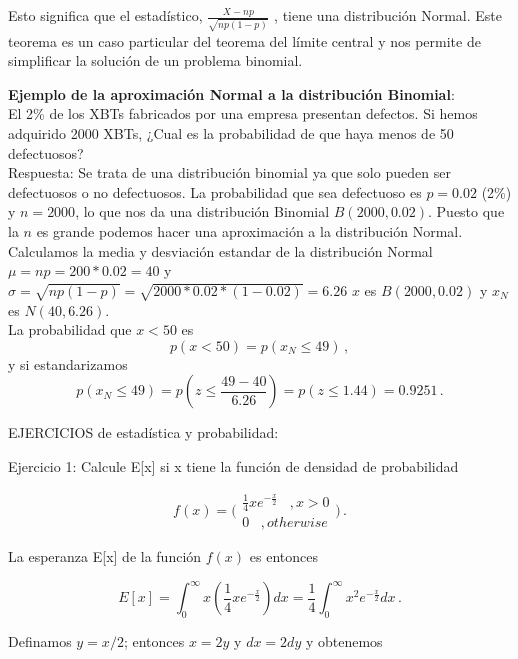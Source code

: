 \documentclass[
]{agujournal2019}
\begin{document}
Esto significa que el estadístico, \(\frac{X-np}{\sqrt{np(1-p)}}\) ,
tiene una distribución Normal. Este teorema es un caso particular del
teorema del límite central y nos permite de simplificar la solución de
un problema binomial.

\vspace{0.5cm}

\textbf{Ejemplo de la aproximación Normal a la distribución Binomial}:\\

El 2\% de los XBTs fabricados por una empresa presentan defectos. Si
hemos adquirido 2000 XBTs, ¿Cual es la probabilidad de que haya menos de
50 defectuosos?\\

Respuesta: Se trata de una distribución binomial ya que solo pueden ser
defectuosos o no defectuosos. La probabilidad que sea defectuoso es
\(p=0.02\) (2\%) y \(n=2000\), lo que nos da una distribución Binomial
\(B(2000,0.02)\). Puesto que la \(n\) es grande podemos hacer una
aproximación a la distribución Normal. Calculamos la media y desviación
estandar de la distribución Normal \(\mu=np=200*0.02=40\) y
\(\sigma=\sqrt{np(1-p)}=\sqrt{2000*0.02*(1-0.02)}=6.26\) \(x\) es
\(B(2000,0.02)\) y \(x_N\) es \(N(40,6.26)\).\\
La probabilidad que \(x<50\) es \[p(x<50)=p(x_N\le 49)\,,\] y si
estandarizamos
\[p(x_N\le 49)=p\left(z\le \frac{49-40}{6.26} \right)=p(z\le 1.44)=0.9251\,.\]

\vspace{0.5cm}

EJERCICIOS de estadística y probabilidad:\\

\vspace{0.5cm}

Ejercicio 1: Calcule E{[}x{]} si x tiene la función de densidad de
probabilidad

\[ f(x)=\Bigg(\begin{array}{c}
 \frac{1}{4}xe^{-\frac{x}{2}}\,\,\,\,\,,x>0 \\ 0 \,\,\,\,\,,otherwise
\end{array})\,.\]

La esperanza E{[}x{]} de la función \(f(x)\) es entonces

\[E[x]=\int^\infty_0 x\left(\frac{1}{4}xe^{-\frac{x}{2}}\right)dx
      =\frac{1}{4}\int^\infty_0 x^2e^{-\frac{x}{2}}dx\,.\]

Definamos \(y=x/2\); entonces \(x=2y\) y \(dx=2dy\) y obtenemos
\end{document}
